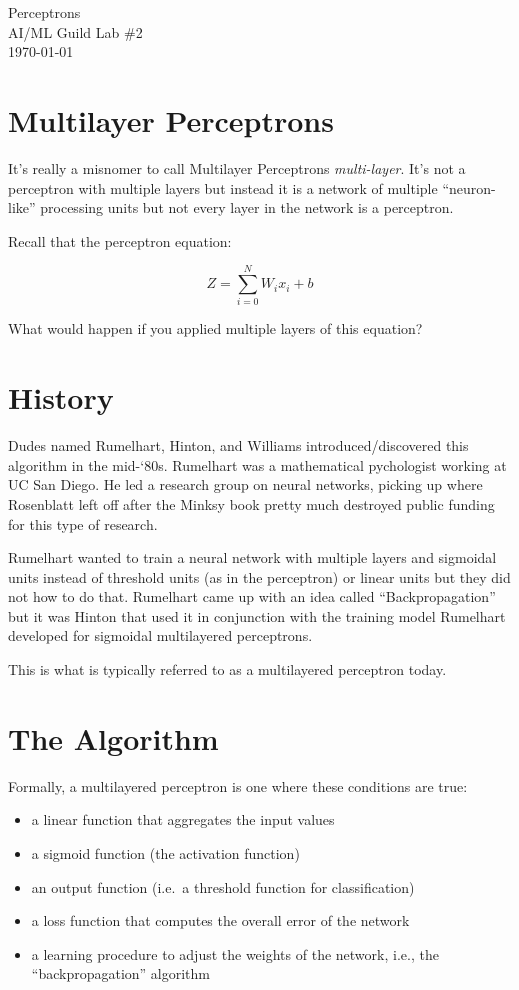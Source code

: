 \documentclass[letterpaper,12pt]{article}
\begin{document}
\begin{flushleft}
    Perceptrons\\
    AI/ML Guild Lab \#2\\
    \today \\
\end{flushleft}

\section{Multilayer Perceptrons}

It's really a misnomer to call Multilayer Perceptrons \emph{multi-layer}. It's
not a perceptron with multiple layers but instead it is a network of multiple
``neuron-like'' processing units but not every layer in the network is a
perceptron.

Recall that the perceptron equation:

\[
    Z = \sum_{i=0}^{N} W_i x_i + b
\]

What would happen if you applied multiple layers of this equation?

\section{History}

Dudes named Rumelhart, Hinton, and Williams introduced/discovered this algorithm
in the mid-‘80s. Rumelhart was a mathematical pychologist working at UC San
Diego. He led a research group on neural networks, picking up where Rosenblatt
left off after the Minksy book pretty much destroyed public funding for this
type of research.

Rumelhart wanted to train a neural network with multiple
layers and sigmoidal units instead of threshold units (as in the perceptron)
or linear units but they did not how to do that. Rumelhart came up with an idea
called ``Backpropagation'' but it was Hinton that used it in conjunction with
the training model Rumelhart developed for sigmoidal multilayered perceptrons.

This is what is typically referred to as a multilayered perceptron today.

\section{The Algorithm}

Formally, a multilayered perceptron is one where these conditions are true:

\begin{itemize}
    \item a linear function that aggregates the input values
    \item a sigmoid function (the activation function)
    \item an output function (i.e.\ a threshold function for classification)
    \item a loss function that computes the overall error of the network
    \item a learning procedure to adjust the weights of the network, i.e., the
        ``backpropagation'' algorithm
\end{itemize}
\end{document}
